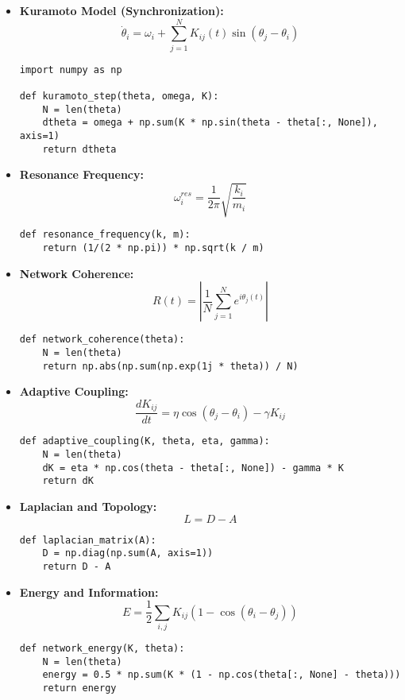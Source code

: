 \documentclass[12pt]{article}
\begin{document}
\begin{itemize}
    \item \textbf{Kuramoto Model (Synchronization):}
    \[
    \dot{\theta}_i = \omega_i + \sum_{j=1}^N K_{ij}(t) \sin(\theta_j - \theta_i)
    \]
    \begin{lstlisting}
import numpy as np

def kuramoto_step(theta, omega, K):
    N = len(theta)
    dtheta = omega + np.sum(K * np.sin(theta - theta[:, None]), axis=1)
    return dtheta
    \end{lstlisting}

    \item \textbf{Resonance Frequency:}
    \[
    \omega_i^{res} = \frac{1}{2\pi} \sqrt{\frac{k_i}{m_i}}
    \]
    \begin{lstlisting}
def resonance_frequency(k, m):
    return (1/(2 * np.pi)) * np.sqrt(k / m)
    \end{lstlisting}

    \item \textbf{Network Coherence:}
    \[
    R(t) = \left| \frac{1}{N} \sum_{j=1}^N e^{i \theta_j(t)} \right|
    \]
    \begin{lstlisting}
def network_coherence(theta):
    N = len(theta)
    return np.abs(np.sum(np.exp(1j * theta)) / N)
    \end{lstlisting}

    \item \textbf{Adaptive Coupling:}
    \[
    \frac{dK_{ij}}{dt} = \eta \cos(\theta_j - \theta_i) - \gamma K_{ij}
    \]
    \begin{lstlisting}
def adaptive_coupling(K, theta, eta, gamma):
    N = len(theta)
    dK = eta * np.cos(theta - theta[:, None]) - gamma * K
    return dK
    \end{lstlisting}

    \item \textbf{Laplacian and Topology:}
    \[
    L = D - A
    \]
    \begin{lstlisting}
def laplacian_matrix(A):
    D = np.diag(np.sum(A, axis=1))
    return D - A
    \end{lstlisting}

    \item \textbf{Energy and Information:}
    \[
    E = \frac{1}{2} \sum_{i,j} K_{ij} (1 - \cos(\theta_i - \theta_j))
    \]
    \begin{lstlisting}
def network_energy(K, theta):
    N = len(theta)
    energy = 0.5 * np.sum(K * (1 - np.cos(theta[:, None] - theta)))
    return energy
    \end{lstlisting}
\end{itemize}
\end{document}

